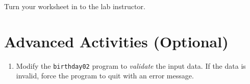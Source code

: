 \documentclass[12pt]{scrartcl}
\begin{document}
Turn your worksheet in to the lab instructor.

\section{Advanced Activities (Optional)}

\begin{enumerate}
  \item Modify the \texttt{birthday02} program to \emph{validate} the
  	input data.  If the data is invalid, force the program to quit with an error
	message.
%
\end{enumerate}
\end{document}
